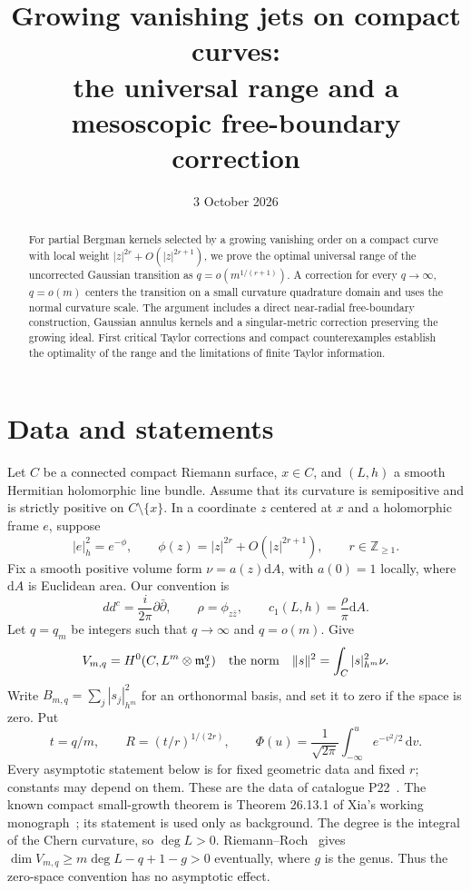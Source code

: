 \documentclass[11pt]{article}
\title{Growing vanishing jets on compact curves:\\
the universal range and a mesoscopic free-boundary correction}
\author{}
\date{3 October 2026}
\theoremstyle{remark}\newtheorem{remark}[theorem]{Remark}
\newcommand{\ddc}{dd^c}
\newcommand{\dA}{\mathrm dA}
\newcommand{\PhiG}{\Phi}
\begin{document}
\maketitle
\begin{abstract}
For partial Bergman kernels selected by a growing vanishing order on a
compact curve with local weight $|z|^{2r}+O(|z|^{2r+1})$, we prove
the optimal universal range of the uncorrected Gaussian transition as
$q=o(m^{1/(r+1)})$. A correction for every $q\to\infty$,
$q=o(m)$ centers the transition on a small curvature quadrature domain
and uses the normal curvature scale. The argument includes a direct
near-radial free-boundary construction, Gaussian annulus kernels and a
singular-metric correction preserving the growing ideal. First critical
Taylor corrections and compact counterexamples establish the optimality
of the range and the limitations of finite Taylor information.
\end{abstract}

\section{Data and statements}
Let $C$ be a connected compact Riemann surface, $x\in C$, and $(L,h)$ a
smooth Hermitian holomorphic line bundle. Assume that its curvature is
semipositive and is strictly positive on $C\setminus\{x\}$. In a
coordinate $z$ centered at $x$ and a holomorphic frame $e$, suppose
\[
 |e|_h^2=e^{-\phi},\qquad
 \phi(z)=|z|^{2r}+O(|z|^{2r+1}),\qquad r\in\mathbb Z_{\geq1}.
\]
Fix a smooth positive volume form $\nu=a(z)\dA$, with $a(0)=1$ locally,
where $\dA$ is Euclidean area. Our convention is
\[
 \ddc=\frac{i}{2\pi}\partial\bar\partial,
 \qquad \rho=\phi_{z\bar z},\qquad c_1(L,h)=\frac{\rho}{\pi}\dA.
\]
Let $q=q_m$ be integers such that $q\to\infty$ and $q=o(m)$. Give
\[
 V_{m,q}=H^0(C,L^m\otimes\mathfrak m_x^q)
 \quad\hbox{the norm}\quad
 \|s\|^2=\int_C|s|_{h^m}^2\nu.
\]
Write $B_{m,q}=\sum_j|s_j|_{h^m}^2$ for an orthonormal basis, and set it
to zero if the space is zero. Put
\[
 t=q/m,\qquad R=(t/r)^{1/(2r)},\qquad
 \PhiG(u)=\frac1{\sqrt{2\pi}}\int_{-\infty}^u e^{-v^2/2}\,\mathrm dv.
\]
Every asymptotic statement below is for fixed geometric data and fixed
$r$; constants may depend on them.
These are the data of catalogue P22~\cite{catalogue}. The known compact
small-growth theorem is Theorem 26.13.1 of Xia's working
monograph~\cite{book}; its statement is used only as background.
The degree is the integral of the Chern curvature, so $\deg L>0$.
Riemann--Roch~\cite[Chapter VI, Section 10]{DA} gives
$\dim V_{m,q}\geq m\deg L-q+1-g>0$ eventually, where $g$ is the
genus. Thus the zero-space convention has no asymptotic effect.
\end{document}
